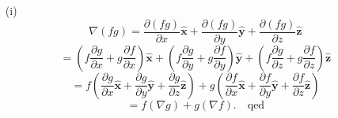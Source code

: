 \documentclass[a4paper,12pt]{article}
\begin{document}
\begin{itemize}
    \item[(i)] 
    \begin{equation}
    \nabla (fg) = \frac{\partial (fg)}{\partial x} \hat{\mathbf{x}} + \frac{\partial (fg)}{\partial y} \hat{\mathbf{y}} + \frac{\partial (fg)}{\partial z} \hat{\mathbf{z}}
    \end{equation}
    \begin{equation}
    = \left( f \frac{\partial g}{\partial x} + g \frac{\partial f}{\partial x} \right) \hat{\mathbf{x}} + \left( f \frac{\partial g}{\partial y} + g \frac{\partial f}{\partial y} \right) \hat{\mathbf{y}} + \left( f \frac{\partial g}{\partial z} + g \frac{\partial f}{\partial z} \right) \hat{\mathbf{z}}
    \end{equation}
    \begin{equation}
    = f \left( \frac{\partial g}{\partial x} \hat{\mathbf{x}} + \frac{\partial g}{\partial y} \hat{\mathbf{y}} + \frac{\partial g}{\partial z} \hat{\mathbf{z}} \right) + g \left( \frac{\partial f}{\partial x} \hat{\mathbf{x}} + \frac{\partial f}{\partial y} \hat{\mathbf{y}} + \frac{\partial f}{\partial z} \hat{\mathbf{z}} \right)
    \end{equation}
    \begin{equation}
    = f (\nabla g) + g (\nabla f). \quad \text{qed}
    \end{equation}


\end{itemize}
\end{document}
